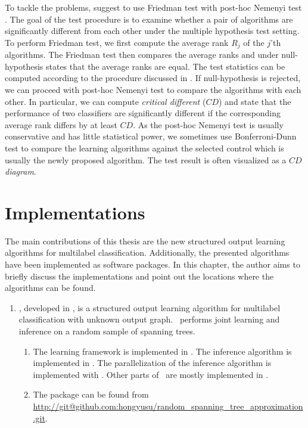 {To tackle the problems, \citet{Demsar06statistical} suggest to use Friedman test \citep{Friedman37the,Friedman40Comparison} with post-hoc Nemenyi test \citep{Nemenyi63distribution}.
The goal of the test procedure is to examine whether a pair of algorithms are significantly different from each other under the multiple hypothesis test setting.
To perform Friedman test, we first compute the average rank $R_j$ of the $j$'th algorithms.
The Friedman test then compares the average ranks and under null-hypothesis states that the average ranks are equal.
The test statistics can be computed according to the procedure discussed in \citep{Demsar06statistical}.
If null-hypothesis is rejected, we can proceed with post-hoc Nemenyi test to compare the algorithms with each other.
In particular, we can compute \textit{critical different} ($CD$) and state that the performance of two classifiers are significantly different if the corresponding average rank differs by at least $CD$.
As the post-hoc Nemenyi test is usually conservative and has little statistical power, we sometimes use Bonferroni-Dunn test \citep{Dunn61mulitple} to compare the learning algorithms against the selected control which is usually the newly proposed algorithm.
The test result is often visualized as a \textit{$CD$ diagram}.
\fi








%
%
\chapter{Implementations} \label{ch_implementation}

The main contributions of this thesis are the new structured output learning algorithms for multilabel classification.
Additionally, the presented algorithms have been implemented as software packages.
In this chapter, the author aims to briefly discuss the implementations and point out the locations where the algorithms can be found.

\begin{enumerate}
	\item \rta, developed in , is a structured output learning algorithm for multilabel classification with unknown output graph. \rta\ performs joint learning and inference on a random sample of spanning trees.
	\begin{enumerate}
		\item The learning framework is implemented in \matlab. The inference algorithm is implemented in \cpp. The parallelization of the inference algorithm is implemented with \openmp. Other parts of \rta\ are mostly implemented in \matlab.
		\item The package can be found from \url{http://git@github.com:hongyusu/random_spanning_tree_approximation.git}.
	\end{enumerate}
	

\end{enumerate}}
